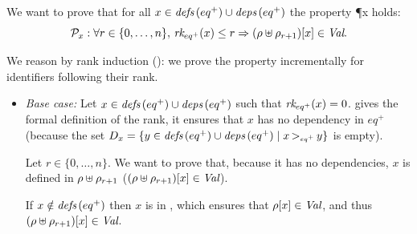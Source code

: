 \begin{skippableproof}
    We want to prove that for all $x \in \defs{eq^+} \cup \deps{eq^+}$ the property \P{x} holds:
    \begin{equation*}
        \P{x}: \forall r \in \{0, \dots, n\}, \, \rank{eq^+}{x} \le r \Rightarrow (\rho \ctxconcat \rho_{r+1})[x] \in \Val.
    \end{equation*}

    We reason by rank induction (): we prove the
    property incrementally for identifiers following their rank.
    \begin{itemize}
        \item \textit{Base case:} Let $x \in \defs{eq^+} \cup \deps{eq^+}$ such that
              $\rank{eq^+}{x} = 0$. 
              gives the formal definition of the rank, it ensures that $x$ has no dependency in
              $eq^+$ (because the set
              $D_x = \{y \in \defs{eq^+} \cup \deps{eq^+} \mid \depOrd{eq^+}{x}{y}\}$ is empty).

              Let $r \in \{0, \dots, n\}$.
              We want to prove that, because it has no dependencies, $x$ is defined in $\rho \ctxconcat \rho_{r+1}$
              (\ie $(\rho \ctxconcat \rho_{r+1})[x] \in \Val$).

              If $x \notin \defs{eq^+}$ then $x$ is in , which ensures that
              $\rho[x] \in \Val$, and thus $(\rho \ctxconcat \rho_{r+1})[x] \in \Val$.


\end{itemize}
\end{skippableproof}
